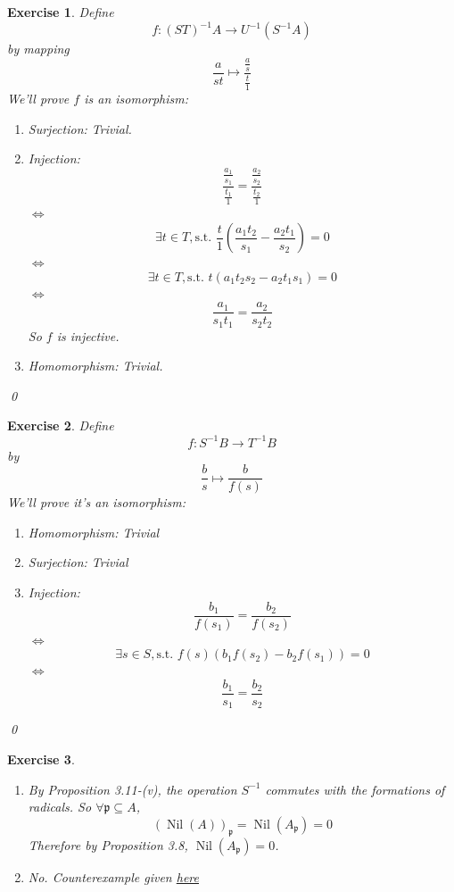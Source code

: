 \documentclass{article}
\theoremstyle{breakstyle}
\newtheorem{exercise}{Exercise}
\DeclareMathOperator{\nil}{Nil}
\begin{document}
\begin{exercise}
    Define
    $$
    f:(ST)^{-1}A\longrightarrow U^{-1}(S^{-1}A)
    $$
    by mapping
    $$
    \frac{a}{st}\longmapsto \frac{\frac{a}{s}}{\frac{t}{1}}
    $$
    We'll prove $f$ is an isomorphism:
    \begin{enumerate}[label=({\roman*})]
        \item Surjection: 
            Trivial.
        \item Injection:
            $$
            \frac{\frac{a_1}{s_1}}{\frac{t_1}{1}}=\frac{\frac{a_2}{s_2}}{\frac{t_2}{1}}
            $$
            $\Leftrightarrow$ 
            $$
            \exists t\in T,\text{s.t. }\frac{t}{1}\left( \frac{a_1t_2}{s_1}-\frac{a_2t_1}{s_2} \right) =0
            $$
            $\Leftrightarrow$ 
            $$
            \exists t\in T,\text{s.t. }t(a_1t_2s_2-a_2t_1s_1)=0
            $$
            $\Leftrightarrow$
            $$
            \frac{a_1}{s_1t_1}=\frac{a_2}{s_2t_2}
            $$
            So $f$ is injective.
        \item Homomorphism:
            Trivial.
    \end{enumerate}
    \qed
\end{exercise}

\begin{exercise}
    Define
    $$
    f:S^{-1}B\longrightarrow T^{-1}B
    $$
    by
    $$
    \frac{b}{s}\longmapsto \frac{b}{f(s)}
    $$
    We'll prove it's an isomorphism:
    \begin{enumerate}[label=({\roman*})]
        \item Homomorphism:
            Trivial
        \item Surjection:
            Trivial
        \item Injection:
            $$
            \frac{b_1}{f(s_1)}=\frac{b_2}{f(s_2)}
            $$
            $\Leftrightarrow$ 
            $$
            \exists s\in S,\text{s.t. }f(s)\left( b_1f(s_2)-b_2f(s_1) \right) =0
            $$
            $\Leftrightarrow$ 
            $$
            \frac{b_1}{s_1}=\frac{b_2}{s_2}
            $$
            
    \end{enumerate}
    \qed
\end{exercise}

\begin{exercise}
    \leavevmode \vspace{-\baselineskip}
    \begin{enumerate}[label=({\roman*})]
        \item 
            By \emph{Proposition 3.11-(v)}, the operation $S^{-1}$ commutes with the formations of radicals.
            So $\forall \mathfrak{p}\subseteq A$,
            $$
            \left( \nil(A) \right) _{\mathfrak{p}}=\nil(A_{\mathfrak{p}})=0
            $$
            Therefore by \emph{Proposition 3.8}, $\nil(A_{\mathfrak{p}})=0$.
        \item 
            No.
            Counterexample given \href{https://math.stackexchange.com/questions/146951/if-the-localization-of-a-ring-r-at-every-prime-ideal-is-an-integral-domain-mu}{here}
    \end{enumerate}
\end{exercise}
\end{document}
